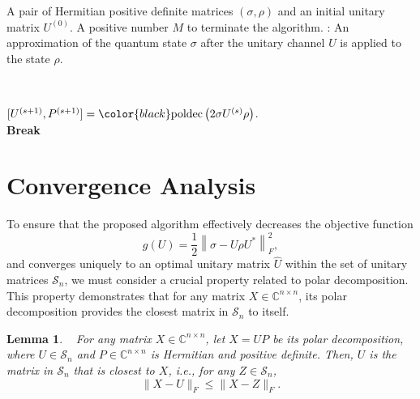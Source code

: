 \documentclass[sn-mathphys-num]{sn-jnl}%
\newtheorem{lemma}{Lemma}[section]
\theoremstyle{thmstyleone}%
\theoremstyle{thmstyletwo}%
\theoremstyle{thmstylethree}%
\begin{document}
\begin{algorithm}[!htt]
\caption{}\label{alg:poldec}
\begin{algorithmic}
\Require A pair of Hermitian positive {\color{black}definite} matrices $(\sigma, \rho)$ and an initial unitary matrix $U^{(0)}$. A positive number $M$ to terminate the algorithm.
\Ensure: {\color{black}An approximation of the quantum state $ \sigma$ after the unitary channel $U$ is applied to the state $\rho$.}

\\\hrulefill
{}
    
    \State $[U^{(s+1)}, P^{(s+1)}] = {\color{black}
    \mbox{{poldec}}\left( 2\sigma U^{(s)}\rho  \right)
    }$. 
    \\
    \State \textbf{Break}
    \EndIf
\EndFor
\end{algorithmic}
\end{algorithm}






\section{Convergence Analysis}

To ensure that the proposed algorithm effectively decreases the objective function 
\[
g(U) = \frac{1}{2} \left\|\sigma - U \rho U^*\right\|_F^2,
\]
and converges uniquely to an optimal unitary matrix $\hat{U}$ within the set of unitary matrices $\mathcal{S}_n$, we must consider a crucial property related to polar decomposition. This property demonstrates that for any matrix $X \in \mathbb{C}^{n \times n}$, its polar decomposition provides the closest matrix in $ \mathcal{S}_n$ to itself.

\begin{lemma}\label{lem:polar}~\cite[Corollary 2.3]{Higham86}
For any matrix $X \in \mathbb{C}^{n \times n}$, let $X = UP$  be its polar decomposition, where $U \in \mathcal{S}_n$ and $P \in \mathbb{C}^{n \times n}$ is Hermitian and positive definite. Then, $U$ is the matrix in $ \mathcal{S}_n$ that is closest to $X$, i.e., for any $Z \in \mathcal{S}_n$,
\begin{equation}\label{eq:polardistance}
\|X - U\|_F \leq \|X - Z\|_F.
\end{equation}
\end{lemma}
\end{document}
